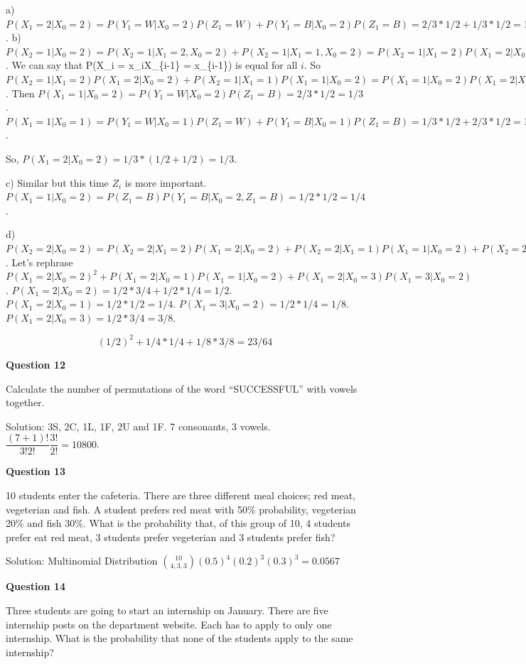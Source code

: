 \documentclass[]{book}
\theoremstyle{definition}
\theoremstyle{definition}
\theoremstyle{definition}
\theoremstyle{remark}
\begin{document}
a)
\(P(X_1 = 2 | X_0 = 2) = P(Y_1 = W|X_0=2)P(Z_1 = W) + P(Y_1 = B|X_0=2)P(Z_1 = B) = 2/3*1/2 + 1/3*1/2 = 1/2\).
b)
\(P(X_2 = 1|X_0=2) = P(X_2 = 1| X_1 = 2, X_0=2) + P(X_2 = 1| X_1 = 1,X_0=2) = P(X_2=1|X_1=2)P(X_1=2|X_0=2) + P(X_2=1|X_1=1)P(X_1=1|X_0=2)\).
We can say that P(X\_i = x\_i\textbar{}X\_\{i-1\} = x\_\{i-1\}) is equal
for all \(i\). So
\(P(X_2=1|X_1=2)P(X_1=2|X_0=2) + P(X_2=1|X_1=1)P(X_1=1|X_0=2) = P(X_1=1|X_0=2)P(X_1=2|X_0=2) + P(X_1=1|X_0=1)P(X_1=1|X_0=2) = P(X_1=1|X_0=2)(P(X_1=2|X_0=2)+P(X_1=1|X_0=1))\).
Then \(P(X_1=1|X_0=2) = P(Y_1=W|X_0=2)P(Z_1=B) = 2/3*1/2 = 1/3\).
\(P(X_1=1|X_0=1) = P(Y_1 = W|X_0=1)P(Z_1 = W) + P(Y_1 = B|X_0=1)P(Z_1 = B) = 1/3*1/2 + 2/3*1/2 = 1/2\).

So, \(P(X_1 = 2 | X_0 = 2) = 1/3*(1/2 + 1/2) = 1/3\).

c) Similar but this time \(Z_i\) is more important.
\(P(X_1 = 1 | X_0 = 2) = P(Z_1 = B)P(Y_1 = B|X_0=2,Z_1=B) = 1/2*1/2=1/4\).

d)
\(P(X_2 = 2 | X_0 = 2) = P(X_2 = 2 | X_1 = 2)P(X_1 = 2 | X_0 = 2) + P(X_2 = 2 | X_1 = 1)P(X_1 = 1 | X_0 = 2) + P(X_2 = 2 | X_1 = 3)P(X_1 = 3 | X_0 = 2)\).
Let's rephrase
\(P(X_1 = 2 | X_0 = 2)^2 + P(X_1 = 2 | X_0 = 1)P(X_1 = 1 | X_0 = 2) + P(X_1 = 2 | X_0 = 3)P(X_1 = 3 | X_0 = 2)\).
\(P(X_1 = 2 | X_0 = 2) = 1/2*3/4 + 1/2*1/4 = 1/2\).
\(P(X_1 = 2|X_0 = 1) = 1/2*1/2 = 1/4\).
\(P(X_1 = 3|X_0 = 2) = 1/2*1/4 = 1/8\).
\(P(X_1 = 2|X_0 = 3) = 1/2*3/4 = 3/8\).

\[(1/2)^2 + 1/4 * 1/4 + 1/8*3/8 = 23/64\]

\textbf{Question 12}

Calculate the number of permutations of the word ``SUCCESSFUL'' with
vowels together.

Solution: 3S, 2C, 1L, 1F, 2U and 1F. 7 consonants, 3 vowels.
\(\dfrac{(7+1)!}{3!2!}\dfrac{3!}{2!}=10800\).

\textbf{Question 13}

10 students enter the cafeteria. There are three different meal choices;
red meat, vegeterian and fish. A student prefers red meat with 50\%
probability, vegeterian 20\% and fish 30\%. What is the probability
that, of this group of 10, 4 students prefer eat red meat, 3 students
prefer vegeterian and 3 students prefer fish?

Solution: Multinomial Distribution
\(\binom{10}{4,3,3}(0.5)^4(0.2)^3(0.3)^3 = 0.0567\)

\textbf{Question 14}

Three students are going to start an internship on January. There are
five internship posts on the department website. Each has to apply to
only one internship. What is the probability that none of the students
apply to the same internship?
\end{document}
